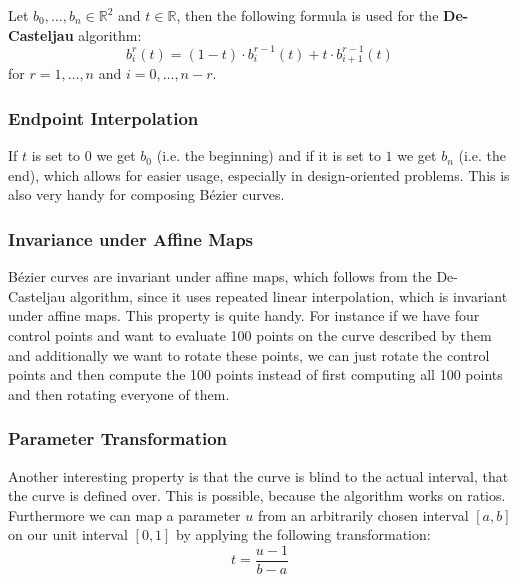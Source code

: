 \begin{definition}
Let $b_0, \dots, b_n \in \mathbb{R}^2$ and $t \in \mathbb{R}$, then the following formula is used for the \textbf{De-Casteljau} algorithm:
\[b_i^r(t) = (1-t) \cdot b_i^{r-1}(t) + t \cdot b_{i+1}^{r-1}(t)\]
for $r = 1, \dots, n$ and $i = 0, \dots, n-r$. \\
\end{definition}
\subsubsection{Endpoint Interpolation}
If $t$ is set to $0$ we get $b_0$ (i.e. the beginning) and if it is set to $1$ we get $b_n$ (i.e. the end), which allows for easier usage, especially in design-oriented problems. This is also very handy for composing Bézier curves.

\subsubsection{Invariance under Affine Maps}
Bézier curves are invariant under affine maps, which follows from the De-Casteljau algorithm, since it uses repeated linear interpolation, which is invariant under affine maps. This property is quite handy. For instance if we have four control points and want to evaluate 100 points on the curve described by them and additionally we want to rotate these points, we can just rotate the control points and then compute the 100 points instead of first computing all 100 points and then rotating everyone of them.

\subsubsection{Parameter Transformation}
Another interesting property is that the curve is blind to the actual interval, that the curve is defined over. This is possible, because the algorithm works on ratios. Furthermore we can map a parameter $u$ from an arbitrarily chosen interval $[a,b]$ on our unit interval $[0,1]$ by applying the following transformation: \[t = \frac{u-1}{b-a}\]

